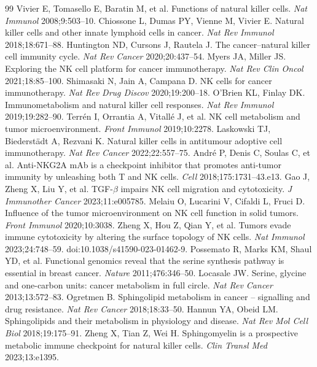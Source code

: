 \documentclass[modern,large,numbered,nocrop]{oup-authoring-template}
\begin{document}
\begin{thebibliography}{99}
 Vivier E, Tomasello E, Baratin M, et al. Functions of natural killer cells. \textit{Nat Immunol} 2008;9:503--10.
 Chiossone L, Dumas PY, Vienne M, Vivier E. Natural killer cells and other innate lymphoid cells in cancer. \textit{Nat Rev Immunol} 2018;18:671--88.
 Huntington ND, Cursons J, Rautela J. The cancer--natural killer cell immunity cycle. \textit{Nat Rev Cancer} 2020;20:437--54.
 Myers JA, Miller JS. Exploring the NK cell platform for cancer immunotherapy. \textit{Nat Rev Clin Oncol} 2021;18:85--100.
 Shimasaki N, Jain A, Campana D. NK cells for cancer immunotherapy. \textit{Nat Rev Drug Discov} 2020;19:200--18.
 O'Brien KL, Finlay DK. Immunometabolism and natural killer cell responses. \textit{Nat Rev Immunol} 2019;19:282--90.
 Terr\'en I, Orrantia A, Vitall\'e J, et al. NK cell metabolism and tumor microenvironment. \textit{Front Immunol} 2019;10:2278.
 Laskowski TJ, Biederst\"adt A, Rezvani K. Natural killer cells in antitumour adoptive cell immunotherapy. \textit{Nat Rev Cancer} 2022;22:557--75.
 Andr\'e P, Denis C, Soulas C, et al. Anti-NKG2A mAb is a checkpoint inhibitor that promotes anti-tumor immunity by unleashing both T and NK cells. \textit{Cell} 2018;175:1731--43.e13.
 Gao J, Zheng X, Liu Y, et al. TGF-$\beta$ impairs NK cell migration and cytotoxicity. \textit{J Immunother Cancer} 2023;11:e005785.
 Melaiu O, Lucarini V, Cifaldi L, Fruci D. Influence of the tumor microenvironment on NK cell function in solid tumors. \textit{Front Immunol} 2020;10:3038.
 Zheng X, Hou Z, Qian Y, et al. Tumors evade immune cytotoxicity by altering the surface topology of NK cells. \textit{Nat Immunol} 2023;24:748--59. doi:10.1038/s41590-023-01462-9.
 Possemato R, Marks KM, Shaul YD, et al. Functional genomics reveal that the serine synthesis pathway is essential in breast cancer. \textit{Nature} 2011;476:346--50.
 Locasale JW. Serine, glycine and one-carbon units: cancer metabolism in full circle. \textit{Nat Rev Cancer} 2013;13:572--83.
 Ogretmen B. Sphingolipid metabolism in cancer -- signalling and drug resistance. \textit{Nat Rev Cancer} 2018;18:33--50.
 Hannun YA, Obeid LM. Sphingolipids and their metabolism in physiology and disease. \textit{Nat Rev Mol Cell Biol} 2018;19:175--91.
 Zheng X, Tian Z, Wei H. Sphingomyelin is a prospective metabolic immune checkpoint for natural killer cells. \textit{Clin Transl Med} 2023;13:e1395.

\end{thebibliography}
\end{document}
